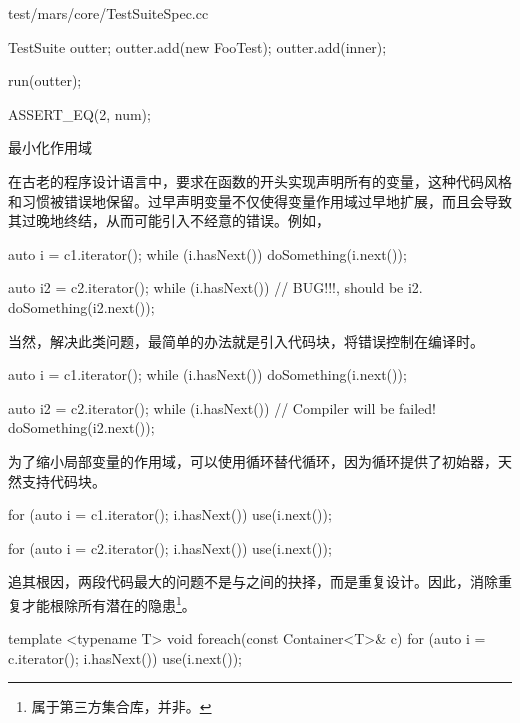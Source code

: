 \begin{content}
\begin{nodiff}{test/mars/core/TestSuiteSpec.cc}
\begin{c++}
{  TestSuite outter;
  outter.add(new FooTest);
  outter.add(inner);

  run(outter);

  ASSERT_EQ(2, num);
} 
\end{c++}
\end{nodiff}

\begin{episode}{最小化作用域}

\begin{content}

在古老的程序设计语言中，要求在函数的开头实现声明所有的变量，这种代码风格和习惯被错误地保留。过早声明变量不仅使得变量作用域过早地扩展，而且会导致其过晚地终结，从而可能引入不经意的错误。例如，

 \begin{c++}[title={\ttfamily{while循环}}]
auto i = c1.iterator();
while (i.hasNext()) {
  doSomething(i.next());
}

auto i2 = c2.iterator();
while (i.hasNext()) {           // BUG!!!, should be i2.
  doSomething(i2.next());
}
 \end{c++}

当然，解决此类问题，最简单的办法就是引入代码块，将错误控制在编译时。

 \begin{c++}[title={\ttfamily{while循环}}]
{
  auto i = c1.iterator();
  while (i.hasNext()) {
    doSomething(i.next());
  }
}

{
  auto i2 = c2.iterator();
  while (i.hasNext()) {           // Compiler will be failed!
    doSomething(i2.next());
  }
}
 \end{c++}

为了缩小局部变量的作用域，可以使用循环替代循环，因为循环提供了初始器，天然支持代码块。

 \begin{c++}[title={\ttfamily{for循环}}]
for (auto i = c1.iterator(); i.hasNext()) {
  use(i.next());
}

for (auto i = c2.iterator(); i.hasNext()) {
  use(i.next());
}
 \end{c++}

追其根因，两段代码最大的问题不是与之间的抉择，而是重复设计。因此，消除重复才能根除所有潜在的隐患\footnote{属于第三方集合库，并非。}。

 \begin{c++}[title={\ttfamily{for循环}}]
template <typename T>
void foreach(const Container<T>& c) {
  for (auto i = c.iterator(); i.hasNext()) {
    use(i.next());
  } 
}
 \end{c++}


\end{content}
\end{episode}
\end{content}

